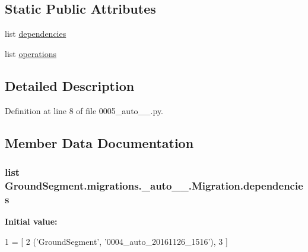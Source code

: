 \subsection*{Static Public Attributes}
\begin{DoxyCompactItemize}
\item 
list \hyperlink{class_ground_segment_1_1migrations_1_10005__auto__20161126__1606_1_1_migration_a4f16857577627191beea8c75fdc3b80c}{dependencies}
\item 
list \hyperlink{class_ground_segment_1_1migrations_1_10005__auto__20161126__1606_1_1_migration_a83a5b4dcd85328de4dd7af7c3b585ea3}{operations}
\end{DoxyCompactItemize}


\subsection{Detailed Description}


Definition at line 8 of file 0005\+\_\+auto\+\_\+\_.\+py.



\subsection{Member Data Documentation}
\hypertarget{class_ground_segment_1_1migrations_1_10005__auto__20161126__1606_1_1_migration_a4f16857577627191beea8c75fdc3b80c}{}
\subsubsection[{dependencies}]{\setlength{\rightskip}{0pt plus 5cm}list Ground\+Segment.\+migrations.\+\_\+auto\+\_\+\_.\+Migration.\+dependencies\hspace{0.3cm}{\ttfamily [static]}}\label{class_ground_segment_1_1migrations_1_10005__auto__20161126__1606_1_1_migration_a4f16857577627191beea8c75fdc3b80c}
{\bfseries Initial value\+:}
\begin{DoxyCode}
1 = [
2         (\textcolor{stringliteral}{'GroundSegment'}, \textcolor{stringliteral}{'0004\_auto\_20161126\_1516'}),
3     ]
\end{DoxyCode}


